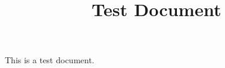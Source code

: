 \documentclass{article}
\title{Test Document}
\begin{document}
\maketitle
This is a test document.
\end{document}
